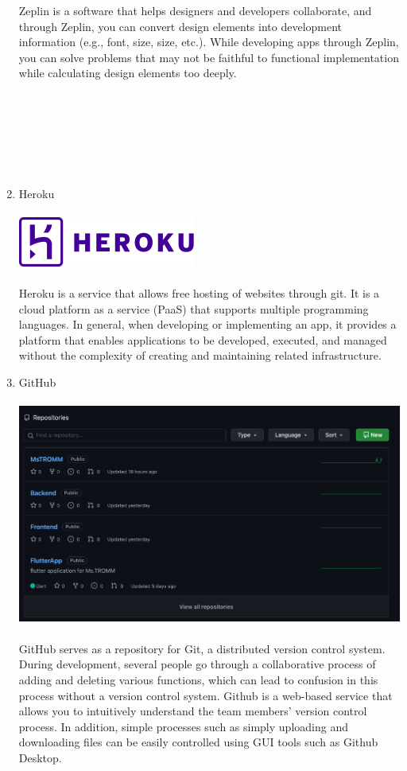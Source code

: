 \documentclass[conference]{IEEEtran}
\begin{document}
\begin{enumerate}
    Zeplin is a software that helps designers and developers collaborate, and through Zeplin, you can convert design elements into development information (e.g., font, size, size, etc.). While developing apps through Zeplin, you can solve problems that may not be faithful to functional implementation while calculating design elements too deeply. \\ \\ \\ \\ \\ \\ \\
    \item Heroku\\\\
    \includegraphics{Heroku.png}
 \\ \\ Heroku is a service that allows free hosting of websites through git. It is a cloud platform as a service (PaaS) that supports multiple programming languages. In general, when developing or implementing an app, it provides a platform that enables applications to be developed, executed, and managed without the complexity of creating and maintaining related infrastructure. \\
    \item GitHub\\\\
    \includegraphics[scale=0.9]{Gtib.png}
 \\ \\ GitHub serves as a repository for Git, a distributed version control system. During development, several people go through a collaborative process of adding and deleting various functions, which can lead to confusion in this process without a version control system. Github is a web-based service that allows you to intuitively understand the team members' version control process. In addition, simple processes such as simply uploading and downloading files can be easily controlled using GUI tools such as Github Desktop. \\
\end{enumerate}{}
\end{document}
